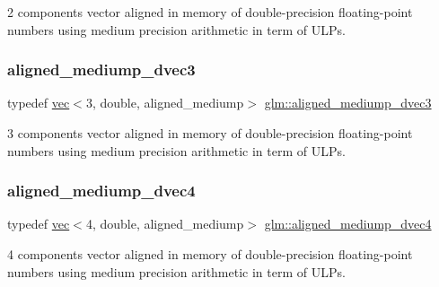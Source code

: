 2 components vector aligned in memory of double-\/precision floating-\/point numbers using medium precision arithmetic in term of U\+L\+Ps. 

\mbox{\label{group__gtc__type__aligned_gacd6fc80d8b9b4322560c9c27927da5e5}} 
\subsubsection{\texorpdfstring{aligned\+\_\+mediump\+\_\+dvec3}{aligned\_mediump\_dvec3}}
{\footnotesize\ttfamily typedef \hyperlink{structglm_1_1vec}{vec}$<$3, double, aligned\+\_\+mediump$>$ \hyperlink{group__gtc__type__aligned_gacd6fc80d8b9b4322560c9c27927da5e5}{glm\+::aligned\+\_\+mediump\+\_\+dvec3}}



3 components vector aligned in memory of double-\/precision floating-\/point numbers using medium precision arithmetic in term of U\+L\+Ps. 

\mbox{\label{group__gtc__type__aligned_gab825a10044970cfc9b5fbb6cfa58b640}} 
\subsubsection{\texorpdfstring{aligned\+\_\+mediump\+\_\+dvec4}{aligned\_mediump\_dvec4}}
{\footnotesize\ttfamily typedef \hyperlink{structglm_1_1vec}{vec}$<$4, double, aligned\+\_\+mediump$>$ \hyperlink{group__gtc__type__aligned_gab825a10044970cfc9b5fbb6cfa58b640}{glm\+::aligned\+\_\+mediump\+\_\+dvec4}}



4 components vector aligned in memory of double-\/precision floating-\/point numbers using medium precision arithmetic in term of U\+L\+Ps. 

